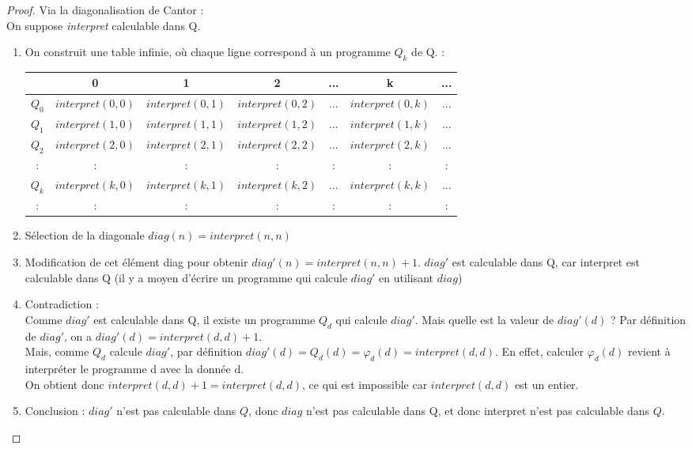 \begin{proof} Via la diagonalisation de Cantor : \\
On suppose \textit{interpret} calculable dans Q.
\begin{enumerate}
	\item On construit une table infinie, où chaque ligne correspond à un programme $Q_k$ de Q.   : \\
		\begin{tabular}{|c||c|c|c|c|c|c|}
			\hline
			& 0 & 1 & 2 & ... & k & ... \\
			\hline
			$Q_0$ & $interpret(0,0)$ & $interpret(0,1)$ & $interpret(0,2)$ & ... & $interpret(0,k)$ & ... \\
			$Q_1$ & $interpret(1,0)$ & $interpret(1,1)$ & $interpret(1,2)$ & ... & $interpret(1,k)$ & ... \\
			$Q_2$ & $interpret(2,0)$ & $interpret(2,1)$ & $interpret(2,2)$ & ... & $interpret(2,k)$ & ... \\
			: & : &:& : & : & : &:\\
			$Q_k$ & $interpret(k,0)$ & $interpret(k,1)$ & $interpret(k,2)$ & ... & $interpret(k,k)$ & ... \\
			: & : &:& : & : & : &:\\
			\hline
		\end{tabular}
	\item Sélection de la diagonale
		$diag(n) = interpret(n,n)$
	\item Modification de cet élément diag pour obtenir
		$diag'(n) = interpret(n,n)+1$.
		$diag'$ est calculable dans Q, car interpret est calculable dans Q (il y a moyen
		d'écrire un programme qui calcule $diag'$ en utilisant $diag$)

	\item Contradiction :\\
	       	Comme $diag'$ est calculable dans Q, il existe un programme $Q_d$ qui calcule $diag'$.  
		Mais quelle est la valeur de $diag'(d)$ ?
		Par définition de $diag'$, on a $diag'(d) = interpret(d,d)+1$. \\
		Mais, comme $Q_d$ calcule $diag'$, par définition $diag'(d) = Q_d(d) = \varphi_d(d) = interpret(d,d)$.
		En effet, calculer $\varphi_d(d)$ revient à interpréter le programme
		d avec la donnée d. \\
		On obtient donc $interpret(d,d)+1 = interpret(d,d)$, ce qui est impossible car $interpret(d,d)$ est un entier. 
	\item Conclusion : $diag'$ n'est pas calculable dans $Q$, donc $diag$
	n'est pas calculable dans Q, et donc interpret n'est pas calculable dans $Q$.

\end{enumerate}
\end{proof}


